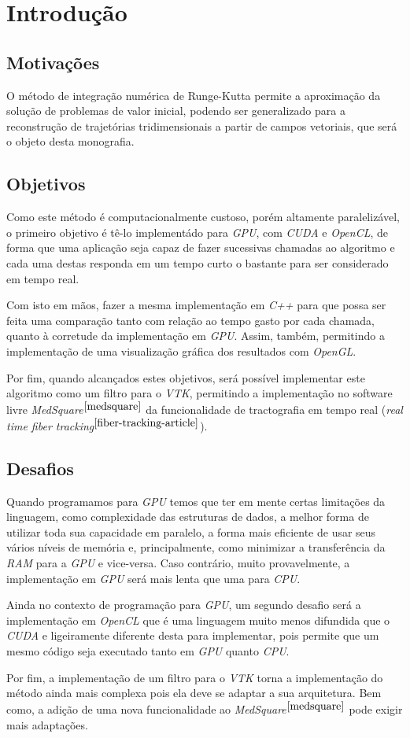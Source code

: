 \chapter{Introdução}

\section{Motivações}
O método de integração numérica de Runge-Kutta permite a aproximação da solução de problemas de valor inicial, podendo ser generalizado para a reconstrução de trajetórias tridimensionais a partir de campos vetoriais, que será o objeto desta monografia.

\section{Objetivos}
Como este método é computacionalmente custoso, porém altamente paralelizável, o primeiro objetivo é tê-lo implementádo para \textit{GPU}, com \textit{CUDA} e \textit{OpenCL}, de forma que uma aplicação seja capaz de fazer sucessivas chamadas ao algoritmo e cada uma destas responda em um tempo curto o bastante para ser considerado em tempo real.

Com isto em mãos, fazer a mesma implementação em \textit{C++} para que possa ser feita uma comparação tanto com relação ao tempo gasto por cada chamada, quanto à corretude da implementação em \textit{GPU}. Assim, também, permitindo a implementação de uma visualização gráfica dos resultados com \textit{OpenGL}.

Por fim, quando alcançados estes objetivos, será possível implementar este algoritmo como um filtro para o \textit{VTK}, permitindo a implementação no software livre \textit{MedSquare}$^{\ref{medsquare}}$ da funcionalidade de tractografia em tempo real (\textit{real time fiber tracking}$^{\ref{fiber-tracking-article}}$).

\newpage
\section{Desafios}
Quando programamos para \textit{GPU} temos que ter em mente certas limitações da linguagem, como complexidade das estruturas de dados, a melhor forma de utilizar toda sua capacidade em paralelo, a forma mais eficiente de usar seus vários níveis de memória e, principalmente, como minimizar a transferência da \textit{RAM} para a \textit{GPU} e vice-versa. Caso contrário, muito provavelmente, a implementação em \textit{GPU} será mais lenta que uma para \textit{CPU}.

Ainda no contexto de programação para \textit{GPU}, um segundo desafio será a implementação em \textit{OpenCL} que é uma linguagem muito menos difundida que o \textit{CUDA} e ligeiramente diferente desta para implementar, pois permite que um mesmo código seja executado tanto em \textit{GPU} quanto \textit{CPU}.

Por fim, a implementação de um filtro para o \textit{VTK} torna a implementação do método ainda mais complexa pois ela deve se adaptar a sua arquitetura. Bem como, a adição de uma nova funcionalidade ao \textit{MedSquare}$^{\ref{medsquare}}$ pode exigir mais adaptações.

